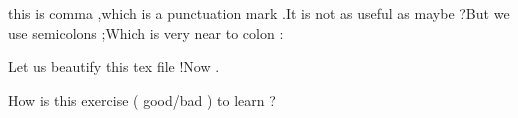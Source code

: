 \documentclass{article}
\begin{document}
this is comma    ,which is a punctuation mark .It is not as useful as maybe   ?But we use semicolons ;Which is very near to colon :

Let us beautify this tex file !Now .

How is this exercise (  good/bad  ) to learn ?
\end{document}
